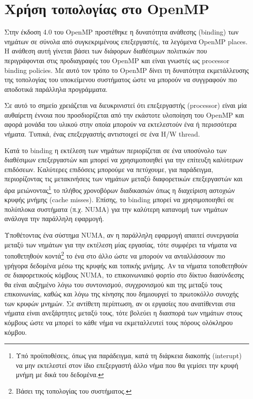 \section{Χρήση τοπολογίας στο OpenMP}
\label{sec:Topology in OpenMP}
Στην έκδοση 4.0 του OpenMP προστέθηκε η δυνατότητα ανάθεσης (binding) των νημάτων σε σύνολα από συγκεκριμένους επεξεργαστές, τα λεγόμενα OpenMP places. Η ανάθεση αυτή γίνεται βάσει των διάφορων διαθέσιμων πολιτικών που περιγράφονται στις προδιαγραφές του OpenMP και είναι γνωστές ως processor binding policies. Με αυτό τον τρόπο το OpenMP δίνει τη δυνατότητα εκμετάλλευσης της τοπολογίας του υποκείμενου συστήματος ώστε %
να μπορούν να συγγραφούν πιο αποδοτικά παράλληλα προγράμματα.

Σε αυτό το σημείο χρειάζεται να διευκρινιστεί ότι επεξεργαστής (processor) είναι μία αυθαίρετη έννοια που προσδιορίζεται από την εκάστοτε υλοποίηση του OpenMP και αφορά μονάδα του υλικού στην οποία μπορούν να εκτελεστούν ένα ή περισσότερα νήματα. Τυπικά, ένας επεξεργαστής αντιστοιχεί σε ένα H/W thread.

Κατά το binding η εκτέλεση των νημάτων περιορίζεται σε ένα υποσύνολο των διαθέσιμων επεξεργαστών και μπορεί να χρησιμοποιηθεί για την επίτευξη καλύτερων επιδόσεων. Καλύτερες επιδόσεις μπορούμε να πετύχουμε, για παράδειγμα, περιορίζοντας τις μετακινήσεις των νημάτων μεταξύ διαφορετικών επεξεργαστών και άρα μειώνοντας\footnote{Υπό προϋποθέσεις, όπως για παράδειγμα, κατά τη διάρκεια διακοπής (interupt) να μην εκτελεστεί στον ίδιο επεξεργαστή άλλο νήμα που θα γεμίσει την κρυφή μνήμη με δικά του δεδομένα.} το πλήθος χρονοβόρων διαδικασιών όπως η διαχείριση αστοχιών κρυφής μνήμης (cache misses). Επίσης, το binding μπορεί να χρησιμοποιηθεί σε πολύπλοκα συστήματα (π.χ. NUMA) για την καλύτερη κατανομή των νημάτων ανάλογα την παράλληλη εφαρμογή.

Υποθέτοντας ένα σύστημα NUMA, αν η παράλληλη εφαρμογή απαιτεί συνεργασία μεταξύ των νημάτων για την εκτέλεση μίας εργασίας, τότε συμφέρει τα νήματα να τοποθετηθούν κοντά\footnote{Βάσει της τοπολογίας του συστήματος.} το ένα στο άλλο ώστε να μπορούν να ανταλλάσσουν πιο γρήγορα δεδομένα μέσω της κρυφής και τοπικής μνήμης. Αν τα νήματα τοποθετηθούν σε διαφορετικούς κόμβους NUMA, το επικοινωνιακό φορτίο στο δίκτυο διασύνδεσης θα είναι αυξημένο λόγω του συντονισμού, συγχρονισμού και της μεταξύ τους επικοινωνίας, καθώς και λόγω της κίνησης που δημιουργεί το πρωτοκόλλο συνοχής των κρυφών μνημών. Σε αντίθετη περίπτωση, αν οι εργασίες που ανατίθενται στα νήματα είναι ανεξάρτητες μεταξύ τους, τότε βολεύει η διασπορά των νημάτων στους κόμβους ώστε να μπορεί το κάθε νήμα να εκμεταλλευτεί τους πόρους ολόκληρου κόμβου.


